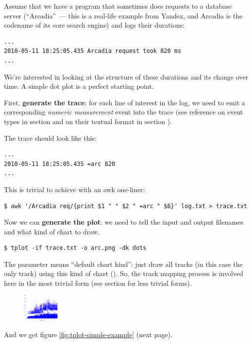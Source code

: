 \documentclass{article}
\begin{document}
Assume that we have a program that sometimes does requests to a database server (``Arcadia''~--- this is a real-life example from Yandex, and Arcadia is the codename of its core search engine) and logs their durations:

\begin{verbatim}
...
2010-05-11 18:25:05.435 Arcadia request took 820 ms
...
\end{verbatim}

We're interested in looking at the structure of these durations and its change over time. A simple dot plot is a perfect starting point.

First, \textbf{generate the trace}: for each line of interest in the log, we need to emit a corresponding \emph{numeric measurement} event into the trace (see reference on event types in section  and on their textual format in section ).

The trace should look like this:
\begin{verbatim}
...
2010-05-11 18:25:05.435 =arc 820
...
\end{verbatim}

This is trivial to achieve with an awk one-liner:
\begin{verbatim}
$ awk '/Arcadia req/{print $1 " " $2 " =arc " $6}' log.txt > trace.txt
\end{verbatim}

Now we can \textbf{generate the plot}: we need to tell \timeplot{} the input and output filenames and what kind of chart to draw.
\begin{verbatim}
$ tplot -if trace.txt -o arc.png -dk dots
\end{verbatim}

The parameter  means ``default chart kind'': just draw all tracks (in this case the only track) using this kind of chart (). So, the track mapping process is involved here in the most trivial form (see section  for less trivial forms).

\begin{figure}
\vspace{-25pt}
\center
\includegraphics[height=40pt]{pics/tplot/dots.png}
\end{figure}
And we get figure \ref{fig:tplot-simple-example} (next page).
\end{document}
